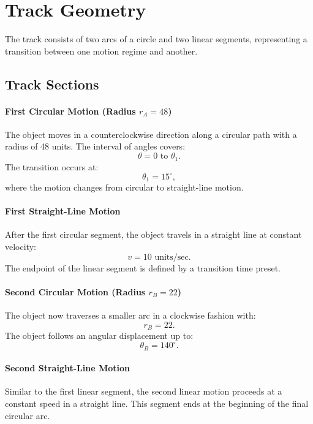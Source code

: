 \documentclass{article}
\begin{document}
\section*{Track Geometry}
The track consists of two arcs of a circle and two linear segments, representing a transition between one motion regime and another.

\subsection*{Track Sections}

\paragraph{First Circular Motion (Radius $r_A = 48$)}
The object moves in a counterclockwise direction along a circular path with a radius of 48 units. The interval of angles covers:
\begin{equation}
\theta = 0 \text{ to } \theta_1.
\end{equation}
The transition occurs at:
\begin{equation}
\theta_1 = 15^\circ,
\end{equation}
where the motion changes from circular to straight-line motion.

\paragraph{First Straight-Line Motion}
After the first circular segment, the object travels in a straight line at constant velocity:
\begin{equation}
v = 10 \text{ units/sec}.
\end{equation}
The endpoint of the linear segment is defined by a transition time preset.

\paragraph{Second Circular Motion (Radius $r_B = 22$)}
The object now traverses a smaller arc in a clockwise fashion with:
\begin{equation}
r_B = 22.
\end{equation}
The object follows an angular displacement up to:
\begin{equation}
\theta_B = 140^\circ.
\end{equation}

\paragraph{Second Straight-Line Motion}
Similar to the first linear segment, the second linear motion proceeds at a constant speed in a straight line. This segment ends at the beginning of the final circular arc.
\end{document}

